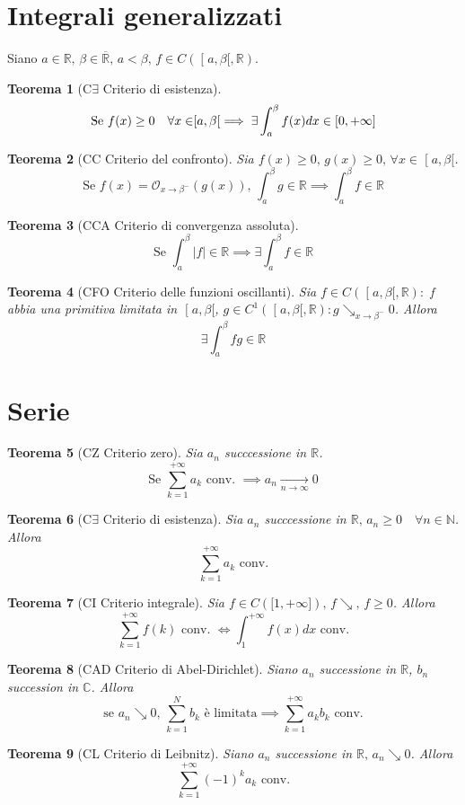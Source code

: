 \documentclass[10pt,a4paper]{article}
\newtheorem{teorema}{Teorema}[section]
\newcommand{\teor}[2][]{\begin{teorema}[#1]#2\end{teorema}}
\newcommand{\R}{\mathbb{R}}
\newcommand{\N}{\mathbb{N}}
\newcommand{\C}{\mathbb{C}}
\newcommand{\Rbar}{\overline{\mathbb{R}}}
\newcommand{\Lim}[1][]{\xrightarrow[#1]{}}
\renewcommand{\,}{\text{, }}
\begin{document}
\section{Integrali generalizzati}
Siano $a \in \R \, \beta \in \Rbar \, a < \beta \,  f \in C(\mathclose [ a, \beta \mathopen [, \R)$.
\teor[C$\exists$ Criterio di esistenza]{
\[
    \text{Se } f(x) \ge 0 \quad \forall x \in \mathclose [ a, \beta \mathopen [ \implies \exists \int_a^{\beta}f(x)dx \in \interval{0}{+\infty}
\]
}
\teor[CC Criterio del confronto]{
Sia $f(x) \ge 0 \, g(x) \ge 0 \, \forall x \in \mathclose [ a, \beta \mathopen [ $.
\[
    \text{Se } f(x) = \mathcal{O}_{x \to \beta ^ -}(g(x)) \, \int_a^{\beta} g \in \R \implies \int_a^{\beta} f \in \R
\]
}
\teor[CCA Criterio di convergenza assoluta]{
    \[
        \text{Se } \int_a^{\beta} \left | f \right | \in \R \implies \exists \int_a^{\beta} f \in \R
    \]
}
\teor[CFO Criterio delle funzioni oscillanti]{
Sia $f \in C(\mathclose [ a, \beta \mathopen [, \R) : $ f abbia una primitiva limitata in $\mathclose [ a, \beta \mathopen [$, $g \in C^{1}(\mathclose [ a, \beta \mathopen [, \R) : g \searrow_{x \to \beta^-} 0$. Allora
\[
    \exists  \int_a^{\beta} fg \in \R
\]
}
\section{Serie}
\teor[CZ Criterio zero]{
    Sia $a_n$ succcessione in $\R$.
    \[
        \text{Se } \sum_{k=1}^{+\infty} a_k \text{ conv. } \implies a_n \Lim[n \to \infty] 0
    \]
}
\teor[C$\exists$ Criterio di esistenza]{
    Sia $a_n$ succcessione in $\R \, a_n \ge 0 \quad \forall n \in \N$. Allora
    \[
        \sum_{k=1}^{+\infty} a_k \text{ conv.}
    \]
}
\teor[CI Criterio integrale]{
    Sia $f \in C(\mathopen [ 1, +\infty \mathclose ]) \, f \searrow \, f \ge 0$. Allora
    \[
        \sum_{k=1}^{+\infty} f(k) \text{ conv. } \iff \int_1^{+\infty} f(x) dx \text{ conv.}
    \]
}
\teor[CAD Criterio di Abel-Dirichlet]{
    Siano $a_n$ successione in $\R$, $b_n$ succession in $\C$. Allora
    \[
        \text{se } a_n \searrow 0 \, \sum_{k=1}^{N} b_k \text{ è limitata} \implies \sum_{k=1}^{+\infty} a_k b_k \text{ conv.}\]
}
\teor[CL Criterio di Leibnitz]{
    Siano $a_n$ successione in $\R \, a_n \searrow 0$. Allora
    \[
        \sum_{k = 1}^{+\infty} (-1)^k a_k \text{ conv.} \]
}
\end{document}
